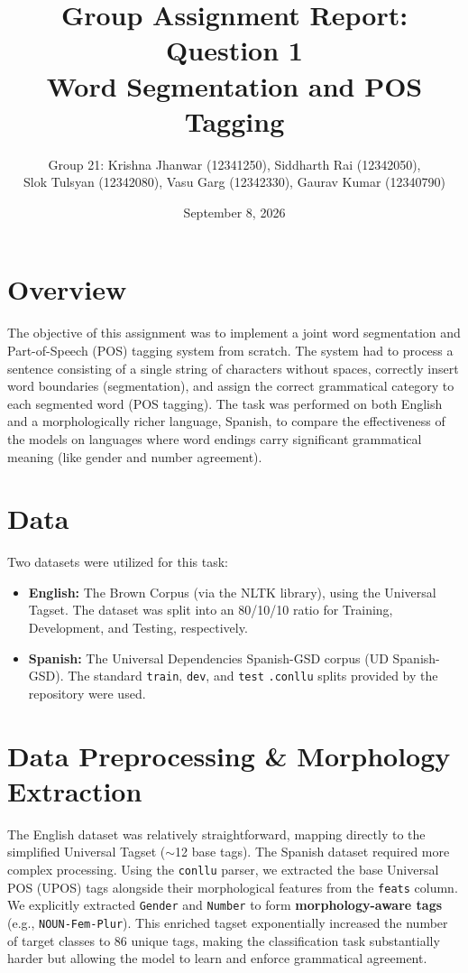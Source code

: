 \documentclass[11pt]{article}
\title{\textbf{Group Assignment Report: Question 1} \\[0.3em]
\large Word Segmentation and POS Tagging}
\author{Group 21: Krishna Jhanwar (12341250), Siddharth Rai (12342050),\\
Slok Tulsyan (12342080), Vasu Garg (12342330), Gaurav Kumar (12340790)}
\date{September 8, 2026}
\newcommand{\code}[1]{\texttt{\small #1}}
\begin{document}
\maketitle

\section{Overview}

The objective of this assignment was to implement a joint word segmentation and Part-of-Speech (POS) tagging system from scratch. The system had to process a sentence consisting of a single string of characters without spaces, correctly insert word boundaries (segmentation), and assign the correct grammatical category to each segmented word (POS tagging). The task was performed on both English and a morphologically richer language, Spanish, to compare the effectiveness of the models on languages where word endings carry significant grammatical meaning (like gender and number agreement).

\section{Data}

Two datasets were utilized for this task:

\begin{itemize}
    \item \textbf{English:} The Brown Corpus (via the NLTK library), using the Universal Tagset. The dataset was split into an 80/10/10 ratio for Training, Development, and Testing, respectively.
    \item \textbf{Spanish:} The Universal Dependencies Spanish-GSD corpus (UD Spanish-GSD). The standard \code{train}, \code{dev}, and \code{test} \code{.conllu} splits provided by the repository were used.
\end{itemize}

\section{Data Preprocessing \& Morphology Extraction}

The English dataset was relatively straightforward, mapping directly to the simplified Universal Tagset ($\sim$12 base tags). The Spanish dataset required more complex processing. Using the \code{conllu} parser, we extracted the base Universal POS (UPOS) tags alongside their morphological features from the \code{feats} column. We explicitly extracted \code{Gender} and \code{Number} to form \textbf{morphology-aware tags} (e.g., \code{NOUN-Fem-Plur}). This enriched tagset exponentially increased the number of target classes to 86 unique tags, making the classification task substantially harder but allowing the model to learn and enforce grammatical agreement.
\end{document}

